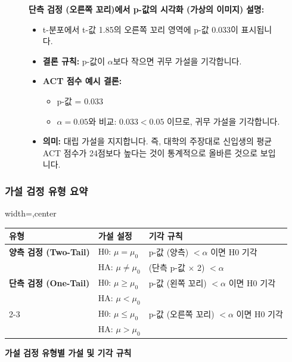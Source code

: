 \documentclass[11pt,a4paper]{book}
\providecommand{\captionof}[2]{\textbf{#2}}
\theoremstyle{definition}
\begin{document}
\begin{figure}[h!]
    \centering
    \captionof{figure}{단측 검정 (오른쪽 꼬리)에서 p-값의 시각화 (가상의 이미지)}
    \label{fig:one_tail_right_p_value}
    \vspace{0.5em}
    \textbf{설명:}
    \begin{itemize}
        \item t-분포에서 t-값 1.85의 오른쪽 꼬리 영역에 p-값 0.033이 표시됩니다.
        \item \textbf{결론 규칙:} p-값이 $\alpha$보다 작으면 귀무 가설을 기각합니다.
        \item \textbf{ACT 점수 예시 결론:}
            \begin{itemize}
                \item p-값 = 0.033
                \item $\alpha = 0.05$와 비교: $0.033 < 0.05$ 이므로, 귀무 가설을 기각합니다.
            \end{itemize}
        \item \textbf{의미:} 대립 가설을 지지합니다. 즉, 대학의 주장대로 신입생의 평균 ACT 점수가 24점보다 높다는 것이 통계적으로 올바른 것으로 보입니다.
    \end{itemize}
\end{figure}

\subsubsection*{가설 검정 유형 요약}

\begin{adjustbox}{width=\textwidth,center}
\begin{tabular}{lll}
\toprule
\textbf{유형} & \textbf{가설 설정} & \textbf{기각 규칙} \\
\midrule
\textbf{양측 검정 (Two-Tail)} & H0: $\mu = \mu_0$ & p-값 (양측) $< \alpha$ 이면 H0 기각 \\
& HA: $\mu \ne \mu_0$ & (단측 p-값 $\times$ 2) $< \alpha$ \\
\midrule
\textbf{단측 검정 (One-Tail)} & H0: $\mu \ge \mu_0$ & p-값 (왼쪽 꼬리) $< \alpha$ 이면 H0 기각 \\
& HA: $\mu < \mu_0$ & \\
\cmidrule{2-3}
& H0: $\mu \le \mu_0$ & p-값 (오른쪽 꼬리) $< \alpha$ 이면 H0 기각 \\
& HA: $\mu > \mu_0$ & \\
\bottomrule
\end{tabular}
\end{adjustbox}
\captionof{table}{가설 검정 유형별 가설 및 기각 규칙}
\label{tab:hypothesis_summary}
\end{document}
